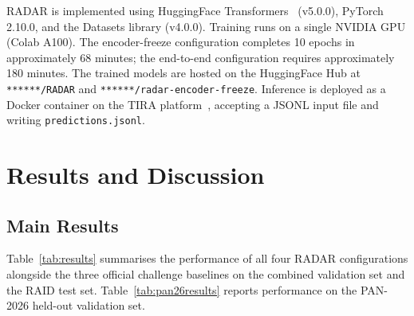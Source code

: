 \documentclass[]{ceurart}
\begin{document}
RADAR is implemented using HuggingFace Transformers~\cite{wolf:2020} (v5.0.0), PyTorch 2.10.0, and the Datasets library (v4.0.0). Training runs on a single NVIDIA GPU (Colab A100). The encoder-freeze configuration completes 10 epochs in approximately 68 minutes; the end-to-end configuration requires approximately 180 minutes. The trained models are hosted on the HuggingFace Hub at \texttt{******/RADAR} and \texttt{******/radar-encoder-freeze}. Inference is deployed as a Docker container on the TIRA platform~\cite{froebe:2023b}, accepting a JSONL input file and writing \texttt{predictions.jsonl}.


\section{Results and Discussion}

\subsection{Main Results}

Table~\ref{tab:results} summarises the performance of all four RADAR configurations alongside the three official challenge baselines on the combined validation set and the RAID test set. Table~\ref{tab:pan26results} reports performance on the PAN-2026 held-out validation set.
\end{document}

